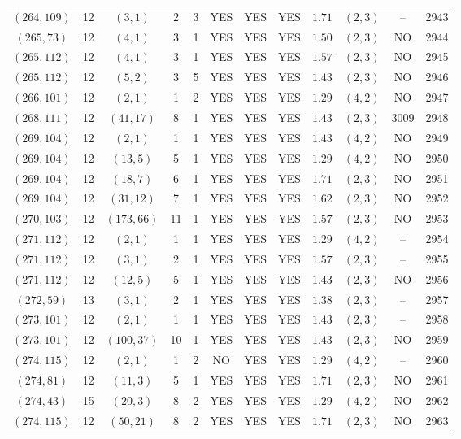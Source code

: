 \begin{longtable}{|c|c|c|c|c|c|c|c|c|c|c|c|}
$(264,109)$ & 12 & $(3,1)$ & 2 & 3 & YES & YES & YES & $1.71$ & $(2,3)$ & -- & 2943\\
$(265,73)$ & 12 & $(4,1)$ & 3 & 1 & YES & YES & YES & $1.50$ & $(2,3)$ & NO & 2944\\
$(265,112)$ & 12 & $(4,1)$ & 3 & 1 & YES & YES & YES & $1.57$ & $(2,3)$ & NO & 2945\\
$(265,112)$ & 12 & $(5,2)$ & 3 & 5 & YES & YES & YES & $1.43$ & $(2,3)$ & NO & 2946\\
$(266,101)$ & 12 & $(2,1)$ & 1 & 2 & YES & YES & YES & $1.29$ & $(4,2)$ & NO & 2947\\
$(268,111)$ & 12 & $(41,17)$ & 8 & 1 & YES & YES & YES & $1.43$ & $(2,3)$ & 3009 & 2948\\
$(269,104)$ & 12 & $(2,1)$ & 1 & 1 & YES & YES & YES & $1.43$ & $(4,2)$ & NO & 2949\\
$(269,104)$ & 12 & $(13,5)$ & 5 & 1 & YES & YES & YES & $1.29$ & $(4,2)$ & NO & 2950\\
$(269,104)$ & 12 & $(18,7)$ & 6 & 1 & YES & YES & YES & $1.71$ & $(2,3)$ & NO & 2951\\
$(269,104)$ & 12 & $(31,12)$ & 7 & 1 & YES & YES & YES & $1.62$ & $(2,3)$ & NO & 2952\\
$(270,103)$ & 12 & $(173,66)$ & 11 & 1 & YES & YES & YES & $1.57$ & $(2,3)$ & NO & 2953\\
$(271,112)$ & 12 & $(2,1)$ & 1 & 1 & YES & YES & YES & $1.29$ & $(4,2)$ & -- & 2954\\
$(271,112)$ & 12 & $(3,1)$ & 2 & 1 & YES & YES & YES & $1.57$ & $(2,3)$ & -- & 2955\\
$(271,112)$ & 12 & $(12,5)$ & 5 & 1 & YES & YES & YES & $1.43$ & $(2,3)$ & NO & 2956\\
$(272,59)$ & 13 & $(3,1)$ & 2 & 1 & YES & YES & YES & $1.38$ & $(2,3)$ & -- & 2957\\
$(273,101)$ & 12 & $(2,1)$ & 1 & 1 & YES & YES & YES & $1.43$ & $(2,3)$ & -- & 2958\\
$(273,101)$ & 12 & $(100,37)$ & 10 & 1 & YES & YES & YES & $1.43$ & $(2,3)$ & NO & 2959\\
$(274,115)$ & 12 & $(2,1)$ & 1 & 2 & NO & YES & YES & $1.29$ & $(4,2)$ & -- & 2960\\
$(274,81)$ & 12 & $(11,3)$ & 5 & 1 & YES & YES & YES & $1.71$ & $(2,3)$ & NO & 2961\\
$(274,43)$ & 15 & $(20,3)$ & 8 & 2 & YES & YES & YES & $1.29$ & $(4,2)$ & NO & 2962\\
$(274,115)$ & 12 & $(50,21)$ & 8 & 2 & YES & YES & YES & $1.71$ & $(2,3)$ & NO & 2963\\

\end{longtable}
